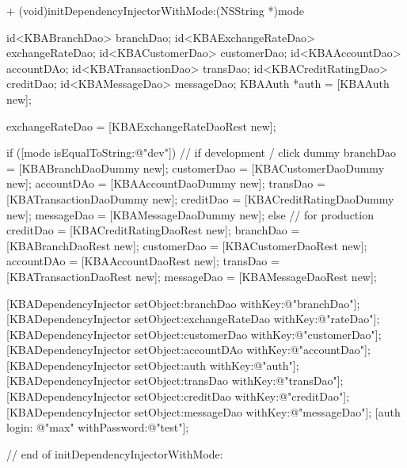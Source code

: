 + (void)initDependencyInjectorWithMode:(NSString *)mode {
	id<KBABranchDao> branchDao;
	id<KBAExchangeRateDao> exchangeRateDao;
	id<KBACustomerDao> customerDao;
	id<KBAAccountDao> accountDAo;
	id<KBATransactionDao> transDao;
	id<KBACreditRatingDao> creditDao;
	id<KBAMessageDao> messageDao;
	KBAAuth *auth = [KBAAuth new];
	
	exchangeRateDao = [KBAExchangeRateDaoRest new];
    
    if ([mode isEqualToString:@"dev"]) { 
		// if development / click dummy
		branchDao = [KBABranchDaoDummy new];
		customerDao = [KBACustomerDaoDummy new];
		accountDAo = [KBAAccountDaoDummy new];
		transDao = [KBATransactionDaoDummy new];
		creditDao = [KBACreditRatingDaoDummy new];
		messageDao = [KBAMessageDaoDummy new];
    }
    else {
		// for production
		creditDao = [KBACreditRatingDaoRest new];
		branchDao = [KBABranchDaoRest new];
		customerDao = [KBACustomerDaoRest new];
		accountDAo = [KBAAccountDaoRest new];
		transDao = [KBATransactionDaoRest new];
		messageDao = [KBAMessageDaoRest new];
	}
    
    [KBADependencyInjector setObject:branchDao withKey:@"branchDao"];
    [KBADependencyInjector setObject:exchangeRateDao withKey:@"rateDao"];
    [KBADependencyInjector setObject:customerDao withKey:@"customerDao"];
    [KBADependencyInjector setObject:accountDAo withKey:@"accountDao"];
    [KBADependencyInjector setObject:auth withKey:@"auth"];
    [KBADependencyInjector setObject:transDao withKey:@"transDao"];
    [KBADependencyInjector setObject:creditDao withKey:@"creditDao"];
    [KBADependencyInjector setObject:messageDao withKey:@"messageDao"];
    [auth login: @"max" withPassword:@"test"];
    
} // end of initDependencyInjectorWithMode: